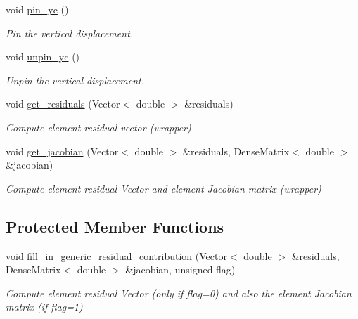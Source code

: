 \begin{DoxyCompactItemize}
void \hyperlink{classoomph_1_1ElasticallySupportedRingElement_acddd4ff64f173aa2d6c4e651c1c9c319}{pin\+\_\+yc} ()
\begin{DoxyCompactList}\small\item\em Pin the vertical displacement. \end{DoxyCompactList}\item 
void \hyperlink{classoomph_1_1ElasticallySupportedRingElement_ad70712dca329430d09d1a905c1362478}{unpin\+\_\+yc} ()
\begin{DoxyCompactList}\small\item\em Unpin the vertical displacement. \end{DoxyCompactList}\item 
void \hyperlink{classoomph_1_1ElasticallySupportedRingElement_ad8bf518168d68e8b016e474e76037a49}{get\+\_\+residuals} (Vector$<$ double $>$ \&residuals)
\begin{DoxyCompactList}\small\item\em Compute element residual vector (wrapper) \end{DoxyCompactList}\item 
void \hyperlink{classoomph_1_1ElasticallySupportedRingElement_a2418f706f5b17a64a5b01b72ccb3b95d}{get\+\_\+jacobian} (Vector$<$ double $>$ \&residuals, Dense\+Matrix$<$ double $>$ \&jacobian)
\begin{DoxyCompactList}\small\item\em Compute element residual Vector and element Jacobian matrix (wrapper) \end{DoxyCompactList}\end{DoxyCompactItemize}
\subsection*{Protected Member Functions}
\begin{DoxyCompactItemize}
\item 
void \hyperlink{classoomph_1_1ElasticallySupportedRingElement_a6d763f2ce0c930e7a2201e995290f169}{fill\+\_\+in\+\_\+generic\+\_\+residual\+\_\+contribution} (Vector$<$ double $>$ \&residuals, Dense\+Matrix$<$ double $>$ \&jacobian, unsigned flag)
\begin{DoxyCompactList}\small\item\em Compute element residual Vector (only if flag=0) and also the element Jacobian matrix (if flag=1) \end{DoxyCompactList}\end{DoxyCompactItemize}
